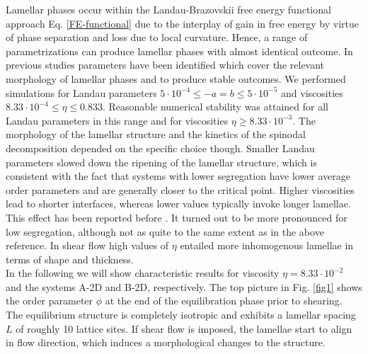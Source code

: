 \documentclass[8.5pt,twoside,twocolumn]{article}
\newcommand{\e}[1]{\cdot10^{#1}}
\begin{document}
Lamellar phases occur within the Landau-Brazovskii free energy functional approach Eq. \ref{FE-functional} due to the interplay of gain in free energy by virtue of phase separation and loss due to local curvature.
Hence, a range of parametrizations can produce lamellar phases with almost identical outcome.
In previous studies \cite{Kendon01,Xu03, Xu06b} parameters have been identified which cover the relevant morphology of lamellar phases and to produce stable outcomes. 
We performed simulations for Landau parameters $5\cdot10^{-4}\le-a=b\le5\cdot10^{-5}$ and viscosities $8.33\cdot10^{-4}\le\eta\le 0.833$.
Reasonable numerical stability was attained for all Landau parameters in this range and for viscosities $\eta\ge 8.33\e{-3}$.
The morphology of the lamellar structure and the kinetics of the spinodal decomposition depended on the specific choice though.
Smaller Landau parameters slowed down the ripening of the lamellar structure, which is consistent with the fact that systems with lower segregation have lower average order parameters and are generally closer to the critical point.
Higher viscosities lead to shorter interfaces, whereas lower values typically invoke longer lamellae.
This effect has been reported before \cite{Gonnella97}.
It turned out to be more pronounced for low segregation, although not as quite to the same extent as in the above reference.
In shear flow high values of $\eta$ entailed more inhomogenous lamellae in terms of shape and thickness.\\
In the following we will show characteristic results for viscosity $\eta=8.33\e{-2}$ and the systems A-2D and B-2D, respectively.
The top picture in Fig. \ref{fig1} shows the order parameter $\phi$ at the end of the equilibration phase prior to shearing.
The equilibrium structure is completely isotropic and exhibits a lamellar spacing $L$ of roughly 10 lattice sites.
If shear flow is imposed, the lamellae start to align in flow direction, which induces a morphological changes to the structure.
\end{document}
